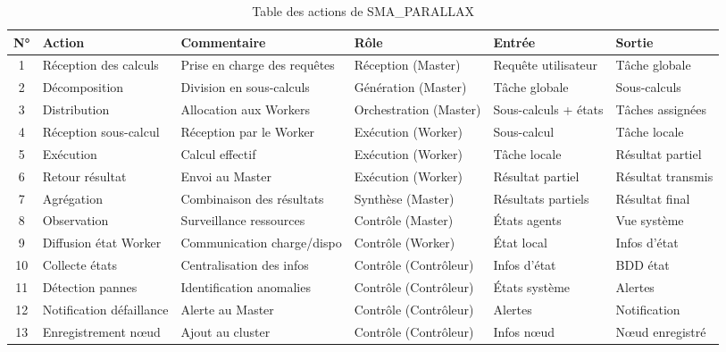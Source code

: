 \documentclass[12pt,a4paper]{report}
\begin{document}
\begin{table}[H]
\centering
\renewcommand{\arraystretch}{1.3}
\begin{tabular}{|c|p{3cm}|p{3.5cm}|p{3cm}|p{2cm}|p{2cm}|}
\hline
\textbf{N°} & \textbf{Action} & \textbf{Commentaire} & \textbf{Rôle} & \textbf{Entrée} & \textbf{Sortie} \\
\hline
1 & Réception des calculs & Prise en charge des requêtes & Réception (Master) & Requête utilisateur & Tâche globale \\
\hline
2 & Décomposition & Division en sous-calculs & Génération (Master) & Tâche globale & Sous-calculs \\
\hline
3 & Distribution & Allocation aux Workers & Orchestration (Master) & Sous-calculs + états & Tâches assignées \\
\hline
4 & Réception sous-calcul & Réception par le Worker & Exécution (Worker) & Sous-calcul & Tâche locale \\
\hline
5 & Exécution & Calcul effectif & Exécution (Worker) & Tâche locale & Résultat partiel \\
\hline
6 & Retour résultat & Envoi au Master & Exécution (Worker) & Résultat partiel & Résultat transmis \\
\hline
7 & Agrégation & Combinaison des résultats & Synthèse (Master) & Résultats partiels & Résultat final \\
\hline
8 & Observation & Surveillance ressources & Contrôle (Master) & États agents & Vue système \\
\hline
9 & Diffusion état Worker & Communication charge/dispo & Contrôle (Worker) & État local & Infos d'état \\
\hline
10 & Collecte états & Centralisation des infos & Contrôle (Contrôleur) & Infos d'état & BDD état \\
\hline
11 & Détection pannes & Identification anomalies & Contrôle (Contrôleur) & États système & Alertes \\
\hline
12 & Notification défaillance & Alerte au Master & Contrôle (Contrôleur) & Alertes & Notification \\
\hline
13 & Enregistrement nœud & Ajout au cluster & Contrôle (Contrôleur) & Infos nœud & Nœud enregistré \\
\hline
\end{tabular}
\caption{Table des actions de SMA\_PARALLAX}
\label{tab:actions}
\end{table}
\end{document}
